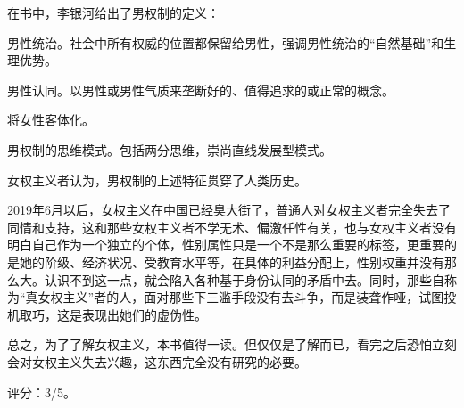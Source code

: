 在书中，李银河给出了男权制的定义：
\begin{itemize*}
	\item 男性统治。社会中所有权威的位置都保留给男性，强调男性统治的“自然基础”和生理优势。
	\item 男性认同。以男性或男性气质来垄断好的、值得追求的或正常的概念。
	\item 将女性客体化。
	\item 男权制的思维模式。包括两分思维，崇尚直线发展型模式。
\end{itemize*}

女权主义者认为，男权制的上述特征贯穿了人类历史。

2019年6月以后，女权主义在中国已经臭大街了，普通人对女权主义者完全失去了同情和支持，这和那些女权主义者不学无术、偏激任性有关，也与女权主义者没有明白自己作为一个独立的个体，性别属性只是一个不是那么重要的标签，更重要的是她的阶级、经济状况、受教育水平等，在具体的利益分配上，性别权重并没有那么大。认识不到这一点，就会陷入各种基于身份认同的矛盾中去。同时，那些自称为“真女权主义”者的人，面对那些下三滥手段没有去斗争，而是装聋作哑，试图投机取巧，这是表现出她们的虚伪性。

总之，为了了解女权主义，本书值得一读。但仅仅是了解而已，看完之后恐怕立刻会对女权主义失去兴趣，这东西完全没有研究的必要。

评分：3/5。